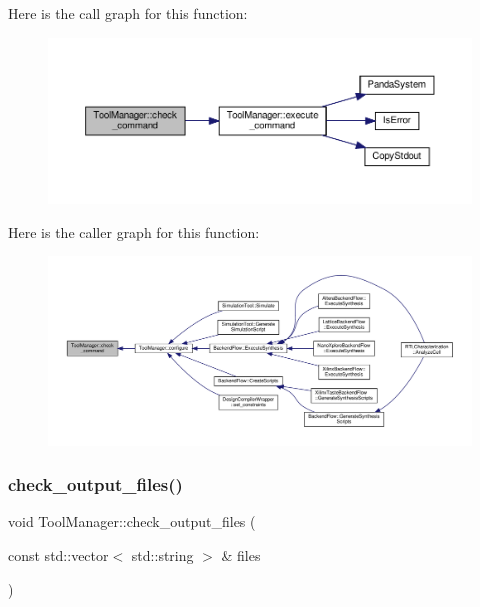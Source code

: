 Here is the call graph for this function\+:
\nopagebreak
\begin{figure}[H]
\begin{center}
\leavevmode
\includegraphics[width=350pt]{dc/dc5/classToolManager_a0301402158ba7ebe5a5f81b04809b761_cgraph}
\end{center}
\end{figure}
Here is the caller graph for this function\+:
\nopagebreak
\begin{figure}[H]
\begin{center}
\leavevmode
\includegraphics[width=350pt]{dc/dc5/classToolManager_a0301402158ba7ebe5a5f81b04809b761_icgraph}
\end{center}
\end{figure}
\mbox{\label{classToolManager_ae3000ed97885017b442bc46241053510}} 
\subsubsection{\texorpdfstring{check\+\_\+output\+\_\+files()}{check\_output\_files()}}
{\footnotesize\ttfamily void Tool\+Manager\+::check\+\_\+output\+\_\+files (\begin{DoxyParamCaption}\item[{const std\+::vector$<$ std\+::string $>$ \&}]{files }\end{DoxyParamCaption})\hspace{0.3cm}{\ttfamily [protected]}}



